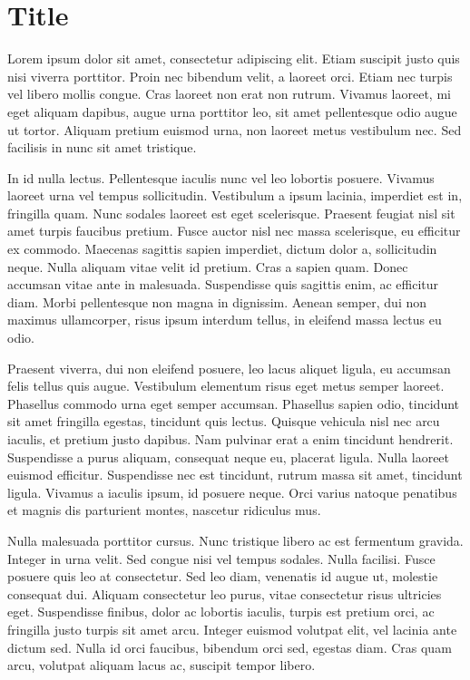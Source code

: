 \documentclass[
  a5paper,
  smalldemyvopaper,10pt,twoside,onecolumn,openright,extrafontsizes,hidelinks]{memoir}
\begin{document}

\chapter{Title}\label{title-2}

Lorem ipsum dolor sit amet, consectetur adipiscing elit. Etiam suscipit
justo quis nisi viverra porttitor. Proin nec bibendum velit, a laoreet
orci. Etiam nec turpis vel libero mollis congue. Cras laoreet non erat
non rutrum. Vivamus laoreet, mi eget aliquam dapibus, augue urna
porttitor leo, sit amet pellentesque odio augue ut tortor. Aliquam
pretium euismod urna, non laoreet metus vestibulum nec. Sed facilisis in
nunc sit amet tristique.

In id nulla lectus. Pellentesque iaculis nunc vel leo lobortis posuere.
Vivamus laoreet urna vel tempus sollicitudin. Vestibulum a ipsum
lacinia, imperdiet est in, fringilla quam. Nunc sodales laoreet est eget
scelerisque. Praesent feugiat nisl sit amet turpis faucibus pretium.
Fusce auctor nisl nec massa scelerisque, eu efficitur ex commodo.
Maecenas sagittis sapien imperdiet, dictum dolor a, sollicitudin neque.
Nulla aliquam vitae velit id pretium. Cras a sapien quam. Donec accumsan
vitae ante in malesuada. Suspendisse quis sagittis enim, ac efficitur
diam. Morbi pellentesque non magna in dignissim. Aenean semper, dui non
maximus ullamcorper, risus ipsum interdum tellus, in eleifend massa
lectus eu odio.

Praesent viverra, dui non eleifend posuere, leo lacus aliquet ligula, eu
accumsan felis tellus quis augue. Vestibulum elementum risus eget metus
semper laoreet. Phasellus commodo urna eget semper accumsan. Phasellus
sapien odio, tincidunt sit amet fringilla egestas, tincidunt quis
lectus. Quisque vehicula nisl nec arcu iaculis, et pretium justo
dapibus. Nam pulvinar erat a enim tincidunt hendrerit. Suspendisse a
purus aliquam, consequat neque eu, placerat ligula. Nulla laoreet
euismod efficitur. Suspendisse nec est tincidunt, rutrum massa sit amet,
tincidunt ligula. Vivamus a iaculis ipsum, id posuere neque. Orci varius
natoque penatibus et magnis dis parturient montes, nascetur ridiculus
mus.

Nulla malesuada porttitor cursus. Nunc tristique libero ac est fermentum
gravida. Integer in urna velit. Sed congue nisi vel tempus sodales.
Nulla facilisi. Fusce posuere quis leo at consectetur. Sed leo diam,
venenatis id augue ut, molestie consequat dui. Aliquam consectetur leo
purus, vitae consectetur risus ultricies eget. Suspendisse finibus,
dolor ac lobortis iaculis, turpis est pretium orci, ac fringilla justo
turpis sit amet arcu. Integer euismod volutpat elit, vel lacinia ante
dictum sed. Nulla id orci faucibus, bibendum orci sed, egestas diam.
Cras quam arcu, volutpat aliquam lacus ac, suscipit tempor libero.
\end{document}
